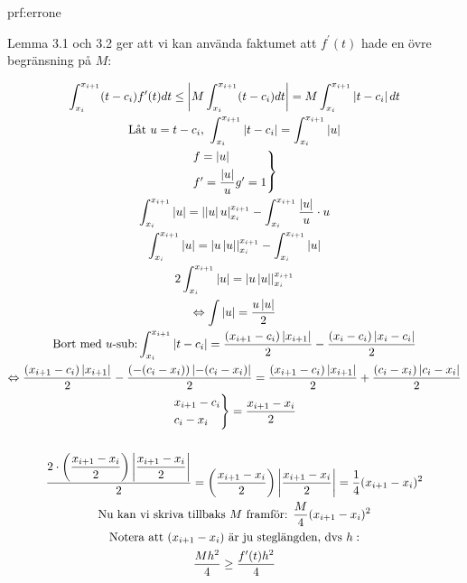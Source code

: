\begin{prf}{prf:errone}

 \par\bigskip
  \noindent Lemma 3.1 och 3.2 ger att vi kan använda faktumet att $f^{\prime}(t)$ hade en övre begränsning på $M$:
  \par\bigskip


  \begin{equation*}
    \begin{gathered}
      \int_{x_i}^{x_{i+1}}(t-c_i)f^{\prime}(t)dt \leq\left|M\int_{x_i}^{x_{i+1}}(t-c_i)dt\right| = M\int_{x_i}^{x_{i+1}}\left|t-c_i\right|dt\\
      \text{Låt } u = t-c_i\text{, } \int_{x_i}^{x_{i+1}}\left|t-c_i\right| = \int_{x_i}^{x_{i+1}}\left|u\right|\\
      \begin{rcases*}
        f = \left|u\right|\\
        f^{\prime} = \dfrac{\left|u\right|}{u}
        g^{\prime} = 1
      \end{rcases*}\\
      \int_{x_i}^{x_{i+1}}\left|u\right| = \left|\left|u\right|u\right|_{x_i}^{x_{i+1}} - \int_{x_i}^{x_{i+1}}\dfrac{\left|u\right|}{u}\cdot u\\
      \int_{x_i}^{x_{i+1}}\left|u\right|= \left|u\left|u\right|\right|_{x_i}^{x_{i+1}}-\int_{x_i}^{x_{i+1}}\left|u\right|\\
      2\int_{x_i}^{x_{i+1}}\left|u\right| = \left|u\left|u\right|\right|_{x_i}^{x_{i+1}}\\
      \Lrarr\int\left|u\right| = \dfrac{u\left|u\right|}{2}\\
      \text{Bort med $u$-sub:} \int_{x_i}^{x_{i+1}}\left|t-c_i\right| = \dfrac{(x_{i+1}-c_i)\left|x_{i+1}\right|}{2}- \dfrac{(x_{i}-c_i)\left|x_{i}-c_i\right|}{2}\\
      \Lrarr \dfrac{(x_{i+1}-c_i)\left|x_{i+1}\right|}{2}- \dfrac{(-(c_i-x_{i}))\left|-(c_i-x_i)\right|}{2} = \dfrac{(x_{i+1}-c_i)\left|x_{i+1}\right|}{2}+\dfrac{(c_i-x_{i})\left|c_i-x_i\right|}{2}\\
      \begin{rcases*}
        x_{i+1}-c_i\\
        c_i-x_i
      \end{rcases*}=\dfrac{x_{i+1}-x_i}{2}\\\\
      \dfrac{2\cdot\left(\dfrac{x_{i+1}-x_i}{2}\right)\left|\dfrac{x_{i+1}-x_i}{2}\right|}{2} = \left(\dfrac{x_{i+1}-x_i}{2}\right)\left|\dfrac{x_{i+1}-x_i}{2}\right| = \dfrac{1}{4}(x_{i+1}-x_i)^2\\
      \text{Nu kan vi skriva tillbaks $M$ framför: } \dfrac{M}{4}(x_{i+1}-x_i)^2\\
      \text{Notera att } (x_{i+1}-x_i) \text{ är ju steglängden, dvs } h:\\
      \dfrac{Mh^2}{4} \geq \dfrac{f^{\prime}(t)h^2}{4}
    \end{gathered}
  \end{equation*}

 \end{prf}
